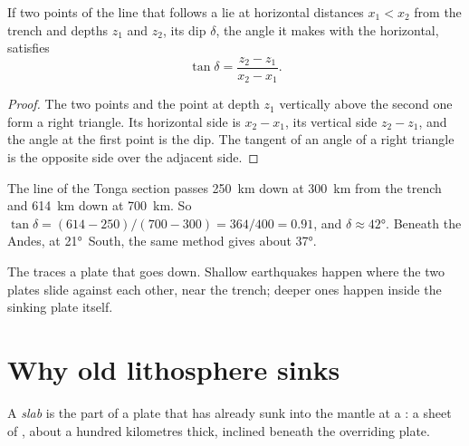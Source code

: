 \begin{proposition}\label{prop:g11:subduction-zones:dip}
If two points of the line that follows a  lie at
horizontal distances $x_1 < x_2$ from the trench and depths $z_1$ and $z_2$,
its dip $\delta$, the angle it makes with the horizontal, satisfies
\[
  \tan \delta = \frac{z_2 - z_1}{x_2 - x_1}.
\]
\end{proposition}

\begin{proof}
The two points and the point at depth $z_1$ vertically above the second one
form a right triangle. Its horizontal side is $x_2 - x_1$, its vertical side
$z_2 - z_1$, and the angle at the first point is the dip. The tangent of an
angle of a right triangle is the opposite side over the adjacent side.
\end{proof}

\begin{example}\label{ex:g11:subduction-zones:dip}
The line of the Tonga section passes \qty{250}{km} down at \qty{300}{km} from
the trench and \qty{614}{km} down at \qty{700}{km}. So
$\tan\delta = (614 - 250)/(700 - 300) = 364/400 = 0.91$, and
$\delta \approx \ang{42}$. Beneath the Andes, at \ang{21}~South, the same
method gives about \ang{37}.
\end{example}

The  traces a plate that goes down. Shallow earthquakes
happen where the two plates slide against each other, near the trench; deeper
ones happen inside the sinking plate itself.

\section{Why old lithosphere sinks}

\begin{definition}[Slab]\label{def:g11:subduction-zones:slab}
A \emph{slab} is the part of a plate that has already sunk into
the mantle at a : a sheet of , about a
hundred kilometres thick, inclined beneath the overriding plate.
\end{definition}

